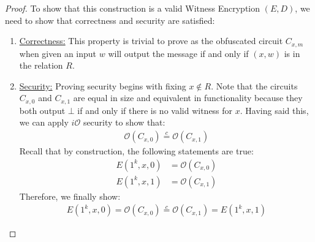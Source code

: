 \documentclass{article}
\newcommand{\ci}{\stackrel{c}{=}}
\newcommand{\io}{i\mathcal{O}}
\begin{document}
\begin{proof}
To show that this construction is a valid Witness Encryption $(E, D)$, we need to show that correctness and security are satisfied:
\begin{enumerate}
    \item \underline{Correctness:} This property is trivial to prove as the obfuscated circuit $C_{x, m}$ when given an input $w$ will output the message if and only if $(x, w)$ is in the relation $R$.

    \item \underline{Security:} Proving security begins with fixing $x \not \in R$. Note that the circuits $C_{x, 0}$ and $C_{x, 1}$ are equal in size and equivalent in functionality because they both output $\bot$ if and only if there is no valid witness for $x$. Having said this, we can apply $\io$ security to show that:
        \begin{align*}
            \mathcal{O}(C_{x, 0}) \ci \mathcal{O}(C_{x, 1})
        \end{align*}
    Recall that by construction, the following statements are true:
        \begin{align*}
            E(1^k, x, 0) &= \mathcal{O}(C_{x, 0}) \\
            E(1^k, x, 1) &= \mathcal{O}(C_{x, 1})
        \end{align*}
    Therefore, we finally show:
        \begin{align*}
            E(1^k, x, 0) = \mathcal{O}(C_{x, 0}) \ci \mathcal{O}(C_{x, 1}) = E(1^k, x, 1)
        \end{align*}
\end{enumerate}
\end{proof}
\end{document}
